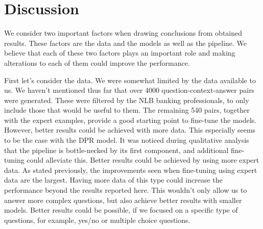 \documentclass[fleqn,moreauthors,10pt]{ds_report}
\begin{document}
\section*{Discussion}

\noindent We consider two important factors when drawing conclusions from obtained results. These factors are the data and the models as well as the pipeline. We believe that each of these two factors plays an important role and making alterations to each of them could improve the performance.

\noindent First let's consider the data.
We were somewhat limited by the data available to us.
We haven't mentioned thus far that over 4000 question-context-answer pairs were generated.
These were filtered by the NLB banking professionals, to only include those that would be useful to them.
The remaining 540 pairs, together with the expert examples, provide a good starting point to fine-tune the models.
However, better results could be achieved with more data. This especially seems to be the case with the DPR model.
It was noticed during qualitative analysis that the pipeline is bottle-necked by its first component, and additional fine-tuning could alleviate this.
Better results could be achieved by using more expert data. As stated previously, the improvements seen when fine-tuning using expert data are the largest. Having more data of this type could increase the performance beyond the results reported here.
This wouldn't only allow us to answer more complex questions, but also achieve better results with smaller models. Better results could be possible, if we focused on a specific type of questions, for example, yes/no or multiple choice questions.
\end{document}
